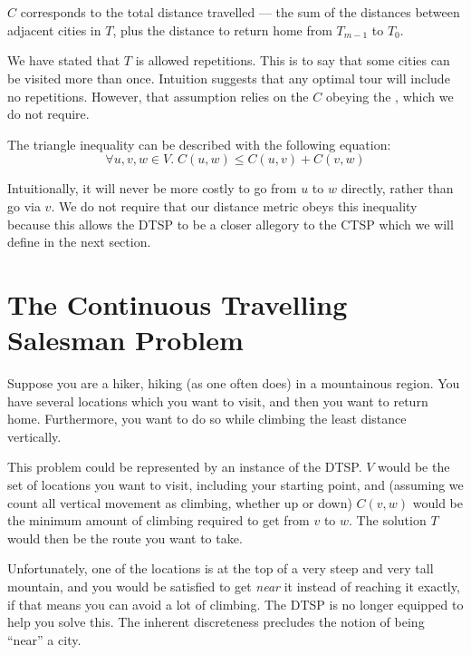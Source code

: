 $\hat{C}$ corresponds to the total distance travelled --- the sum of the distances between adjacent cities in $T$, plus the distance to return home from $T_{m-1}$ to $T_0$.

We have stated that $T$ is allowed repetitions. This is to say that some cities can be visited more than once. Intuition suggests that any optimal tour will include no repetitions. However, that assumption relies on the  $C$ obeying the , which we do not require.

The triangle inequality can be described with the following equation:
\begin{equation*}
  \forall u,v,w\in V.\; C(u,w) \leq C(u,v) + C(v,w)
\end{equation*} 

Intuitionally, it will never be more costly to go from $u$ to $w$ directly, rather than go via $v$. We do not require that our distance metric obeys this inequality because this allows the DTSP to be a closer allegory to the CTSP which we will define in the next section.

\todo[Illustration]

\section{The Continuous Travelling Salesman Problem}

Suppose you are a hiker, hiking (as one often does) in a mountainous region. You have several locations which you want to visit, and then you want to return home. Furthermore, you want to do so while climbing the least distance vertically.


This problem could be represented by an instance of the DTSP. $V$ would be the set of locations you want to visit, including your starting point, and (assuming we count all vertical movement as climbing, whether up or down) $C(v,w)$ would be the minimum amount of climbing required to get from $v$ to $w$. The solution $T$ would then be the route you want to take.

Unfortunately, one of the locations is at the top of a very steep and very tall mountain, and you would be satisfied to get \textit{near} it instead of reaching it exactly, if that means you can avoid a lot of climbing. The DTSP is no longer equipped to help you solve this. The inherent discreteness precludes the notion of being ``near'' a city.


